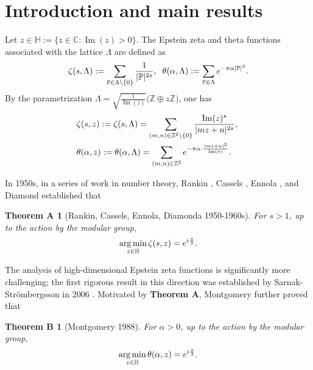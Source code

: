 \documentclass[reqno,english]{amsart}
\newtheorem*{thmA}{Theorem A}
\newtheorem*{thmB}{Theorem B}
\newtheorem{open problem}{Open Problem}[section]
\newtheorem{open question}{Open Question}[section]
\newtheorem{open questions on hexagonal lattice}{Open Questions on hexagonal lattice}[section]
\renewcommand{\Im}{\operatorname{Im}}
\DeclareMathOperator*{\argmin}{arg\,min}
\begin{document}
\section{Introduction and main results}
\setcounter{equation}{0}







Let $ z\in \mathbb{H}:=\{z\in\mathbb{C}: \Im(z)>0\}$. The Epstein zeta and theta functions associated with the lattice $ \Lambda$ are defined as
 \begin{equation}\aligned
 \nonumber
\zeta(s,\Lambda):=\sum_{\mathbb{P}\in \Lambda\setminus\{0\}}\frac{1}{|\mathbb{P}|^{2s}},\;\;
\theta(\alpha,\Lambda):=\sum_{\mathbb{P}\in\Lambda} e^{-\pi\alpha |\mathbb{P}|^2}.
\endaligned\end{equation}
By the parametrization $\Lambda =\sqrt{\frac{1}{\Im(z)}}\Big({\mathbb Z}\oplus z{\mathbb Z}\Big)$, one has
 \begin{equation}\aligned
 \label{thetas}
&\zeta(s,z):=\zeta(s,\Lambda)=\sum_{(m,n)\in\mathbb{Z}^2\backslash\{0\}}\frac{\Im(z)^s}{|mz+n|^{2s}},\;\\
&\theta(\alpha,z):=\theta(\alpha,\Lambda)=\sum_{(m,n)\in\mathbb{Z}^2}e^{-\pi \alpha\cdot\frac{|mz+n|^{2}}{\Im(z)}}.
\endaligned\end{equation}


In 1950s, in a series of work in number theory, Rankin \cite{Ran1953}, Cassels \cite{Cas1959}, Ennola \cite{Enn1964a}, and Diamond \cite{Dia1964} established that
\begin{thmA}[Rankin, Cassels, Ennola, Diamonda 1950-1960s] For $s>1$, up to the action by the modular group,
\begin{equation}\aligned\nonumber
\argmin_{z\in\mathbb{H}}\zeta(s,z)=e^{i\frac{\pi}{3}}.
\endaligned\end{equation}
\end{thmA}
The analysis of high-dimensional Epstein zeta functions is significantly more challenging; the first rigorous result in this direction was established by Sarnak-Str\"{o}mbergsson \cite{Sarnak2006} in 2006 .
Motivated by {\bf Theorem A},
Montgomery \cite{Mon1988} further proved that
\begin{thmB}[Montgomery 1988] For $\alpha>0$, up to the action by the modular group,
\begin{equation}\aligned\nonumber
\argmin_{z\in\mathbb{H}}\theta(\alpha,z)=e^{i\frac{\pi}{3}}.
\endaligned\end{equation}
\end{thmB}
\end{document}
